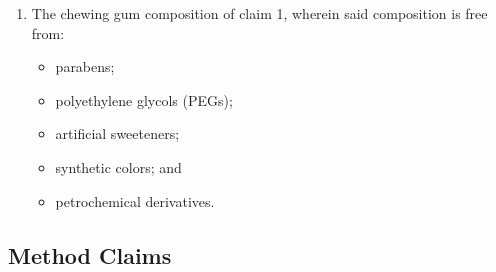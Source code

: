 \documentclass[12pt]{article}
\begin{document}
\begin{enumerate}
    \item The chewing gum composition of claim 1, wherein said composition is free from:
    \begin{itemize}
        \item parabens;
        \item polyethylene glycols (PEGs);
        \item artificial sweeteners;
        \item synthetic colors; and
        \item petrochemical derivatives.
    \end{itemize}
\end{enumerate}

\subsection*{Method Claims}
\end{document}
